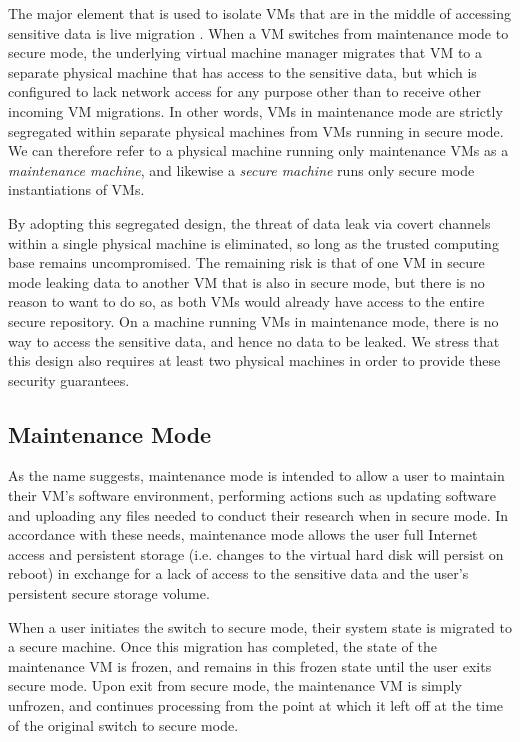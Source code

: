 \documentclass{acm_proc_article-sp}
\begin{document}
The major element that is used to isolate VMs that are in the middle of
accessing sensitive data is live migration \cite{migration-clark}.  When a VM
switches from maintenance mode to secure mode, the underlying virtual machine
manager migrates that VM to a separate physical machine that has access to the
sensitive data, but which is configured to lack network access for any purpose
other than to receive other incoming VM migrations.  In other words, VMs in
maintenance mode are strictly segregated within separate physical machines from
VMs running in secure mode.  We can therefore refer to a physical machine
running only maintenance VMs as a \emph{maintenance machine}, and likewise a
\emph{secure machine} runs only secure mode instantiations of VMs.

By adopting this segregated design, the threat of data leak via covert channels
within a single physical machine is eliminated, so long as the trusted computing
base remains uncompromised.  The remaining risk is that of one VM in secure mode
leaking data to another VM that is also in secure mode, but there is no reason
to want to do so, as both VMs would already have access to the entire secure
repository.  On a machine running VMs in maintenance mode, there is no way to
access the sensitive data, and hence no data to be leaked.  We stress that this
design also requires at least two physical machines in order to provide these
security guarantees.

\subsection{Maintenance Mode}

As the name suggests, maintenance mode is intended to allow a user to maintain
their VM's software environment, performing actions such as updating software
and uploading any files needed to conduct their research when in secure mode.
In accordance with these needs, maintenance mode allows the user full Internet
access and persistent storage (i.e.  changes to the virtual hard disk will
persist on reboot) in exchange for a lack of access to the sensitive data and
the user's persistent secure storage volume.

When a user initiates the switch to secure mode, their system state is migrated
to a secure machine.  Once this migration has completed, the state of the
maintenance VM is frozen, and remains in this frozen state until the user exits
secure mode.  Upon exit from secure mode, the maintenance VM is simply unfrozen,
and continues processing from the point at which it left off at the time of the
original switch to secure mode.
\end{document}
